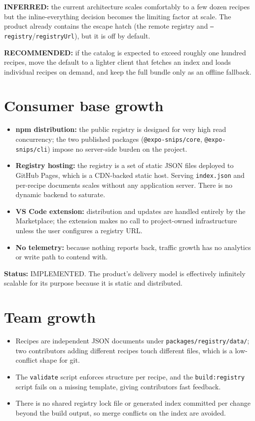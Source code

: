 \textbf{INFERRED:} the current architecture scales comfortably to a few dozen
recipes but the inline-everything decision becomes the limiting factor at
scale. The product already contains the escape hatch (the remote registry and
\texttt{--registry}/\texttt{registryUrl}), but it is off by default.

\textbf{RECOMMENDED:} if the catalog is expected to exceed roughly one hundred
recipes, move the default to a lighter client that fetches an index and loads
individual recipes on demand, and keep the full bundle only as an offline
fallback.

\section{Consumer base growth}

\begin{itemize}
  \item \textbf{npm distribution:} the public registry is designed for very high
        read concurrency; the two published packages (\texttt{@expo-snips/core},
        \texttt{@expo-snips/cli}) impose no server-side burden on the project.
  \item \textbf{Registry hosting:} the registry is a set of static JSON files
        deployed to GitHub Pages, which is a CDN-backed static host. Serving
        \texttt{index.json} and per-recipe documents scales without any
        application server. There is no dynamic backend to saturate.
  \item \textbf{VS Code extension:} distribution and updates are handled entirely
        by the Marketplace; the extension makes no call to project-owned
        infrastructure unless the user configures a registry URL.
  \item \textbf{No telemetry:} because nothing reports back, traffic growth has no
        analytics or write path to contend with.
\end{itemize}

\textbf{Status:} IMPLEMENTED. The product's delivery model is effectively
infinitely scalable for its purpose because it is static and distributed.

\section{Team growth}

\begin{itemize}
  \item Recipes are independent JSON documents under
        \texttt{packages/registry/data/}; two contributors adding different
        recipes touch different files, which is a low-conflict shape for git.
  \item The \texttt{validate} script enforces structure per recipe, and the
        \texttt{build:registry} script fails on a missing template, giving
        contributors fast feedback.
  \item There is no shared registry lock file or generated index committed per
        change beyond the build output, so merge conflicts on the index are
        avoided.
\end{itemize}

